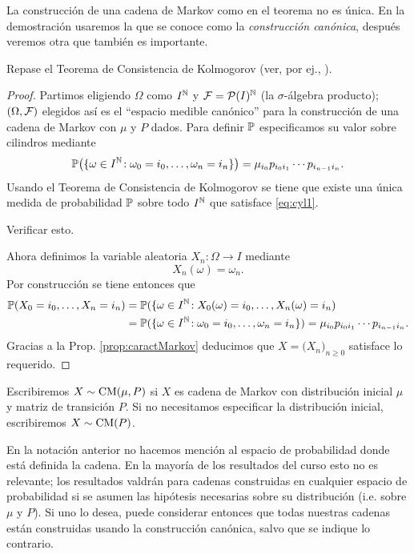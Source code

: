 La construcción de una cadena de Markov como en el teorema no es única.
En la demostración usaremos la que se conoce como la \emph{construcción canónica}, después veremos otra que también es importante.

\begin{sqgnote}
Repase el Teorema de Consistencia de Kolmogorov (ver, por ej., \cite{medidaJSM}).
\end{sqgnote}

\begin{proof}
Partimos eligiendo $\Omega$ como $I^{\mathbb{N}}$ y $\mathcal{F}=\mathcal{P}(I)^{\mathbb{N}}$ (la $\sigma$-álgebra producto); $(\Omega,\mathcal{F})$ elegidos así es el ``espacio medible canónico'' para la construcción de una cadena de Markov con $\mu$ y $P$ dados.
Para definir $\mathbb{P}$ especificamos su valor sobre cilindros mediante
\begin{equation}\label{eq:cyl1}
\mathbb{P}\big(\{\omega\in I^{\mathbb{N}}\!:\omega_{0}=i_0,\dotsc,\omega_n=i_n\}\big)=\mu_{i_0}p_{i_0i_1}\dotsm p_{i_{n-1}i_n}.
\end{equation}
Usando el Teorema de Consistencia de Kolmogorov se tiene que existe una única medida de probabilidad $\mathbb{P}$ sobre todo $I^{\mathbb{N}}$ que satisface \eqref{eq:cyl1}.

\begin{exer}
Verificar esto.
\end{exer}

\noindent Ahora definimos la variable aleatoria $X_n\!:\Omega\longrightarrow I$ mediante
\[X_n(\omega)=\omega_n.\]
Por construcción se tiene entonces que
\begin{align}
\mathbb{P}(X_0=i_0,\dotsc,X_n=i_n)&=\mathbb{P}(\{\omega\in I^{\mathbb{N}}\!:X_0(\omega)=i_0,\dotsc,X_n(\omega)=i_n)\\
&=\mathbb{P}(\{\omega\in I^{\mathbb{N}}\!:\omega_{0}=i_0,\dotsc,\omega_n=i_n\})=\mu_{i_0}p_{i_0i_1}\dotsm p_{i_{n-1}i_n}.
\end{align}
Gracias a la Prop. \ref{prop:caractMarkov} deducimos que $X=\big(X_n\big)_{n\geq0}$ satisface lo requerido.
\end{proof}

\begin{notation}
Escribiremos $X\sim\text{\upshape{CM}}(\mu,P)$ si $X$ es cadena de Markov con distribución inicial $\mu$ y matriz de transición $P$.
Si no necesitamos especificar la distribución inicial, escribiremos $X\sim\text{\upshape{CM}}(P)$.
\end{notation}

En la notación anterior no hacemos mención al espacio de probabilidad donde está definida la cadena.
En la mayoría de los resultados del curso esto no es relevante; los resultados valdrán para cadenas construidas en cualquier espacio de probabilidad si se asumen las hipótesis necesarias sobre su distribución (i.e. sobre $\mu$ y $P$).
Si uno lo desea, puede considerar entonces que todas nuestras cadenas están construidas usando la construcción canónica, salvo que se indique lo contrario.

